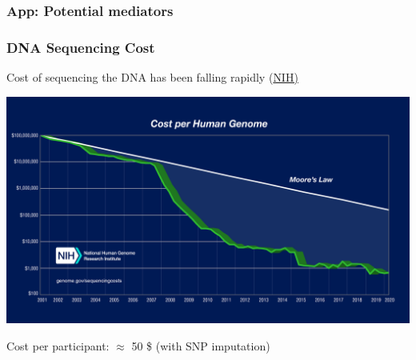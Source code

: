 \documentclass[10pt,compress,xcolor=dvipsnames,aspectratio=169]{beamer}    %
\newcounter{ex}
\newcommand{\1}[1]{\mathrm{1\hspace*{-2.5pt}l}[#1]}	%
\begin{document}
\subsubsection{App: Potential mediators}
%
%
%

\begin{frame}\label{frame:dollargenome}
\frametitle{DNA Sequencing Cost}
Cost of sequencing the DNA has been falling rapidly (\href{https://www.genome.gov/about-genomics/fact-sheets/Sequencing-Human-Genome-cost}{NIH)}

\includegraphics[height=0.7\textheight]{./include/Sequencing_Cost_per_Genome_May2020.jpg}

\vspace{2ex}

Cost per participant: $\approx$ 50 \$ (with SNP imputation)

\hyperlink{frame:why}{}

\end{frame}
\end{document}
